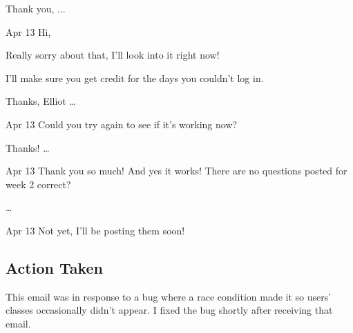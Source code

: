 \begin{appendices}
Thank you,
   ...
   
Apr 13
Hi,

Really sorry about that, I'll look into it right now!

I'll make sure you get credit for the days you couldn't log in.

Thanks,
Elliot
…
 
Apr 13
Could you try again to see if it's working now?

Thanks!
…
 
Apr 13
Thank you so much! And yes it works! There are no questions posted for week 2 correct? 


…

Apr 13
Not yet, I'll be posting them soon!

\subsection{Action Taken}
\par This email was in response to a bug where a race condition made it so users' classes occasionally didn't appear. I fixed the bug shortly after receiving that email.

\end{appendices}